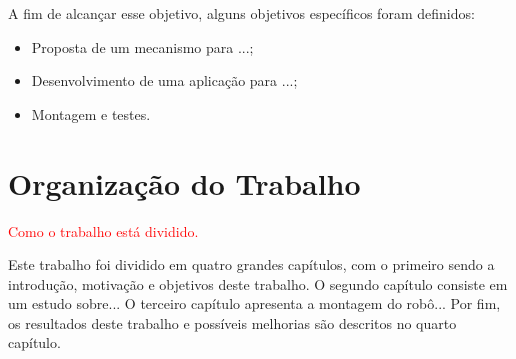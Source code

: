 A fim de alcançar esse objetivo, alguns objetivos específicos foram definidos:
\begin{itemize}
    \item Proposta de um mecanismo para ...;
    \item Desenvolvimento de uma aplicação para ...;
    \item Montagem e testes.
\end{itemize}

\section{Organização do Trabalho}

\textcolor{red}{Como o trabalho está dividido.}

Este trabalho foi dividido em quatro grandes capítulos, com o primeiro sendo a introdução, motivação e objetivos deste trabalho. O segundo capítulo consiste em um estudo sobre... O terceiro capítulo apresenta a montagem do robô... Por fim, os resultados deste trabalho e possíveis melhorias são descritos no quarto capítulo.


